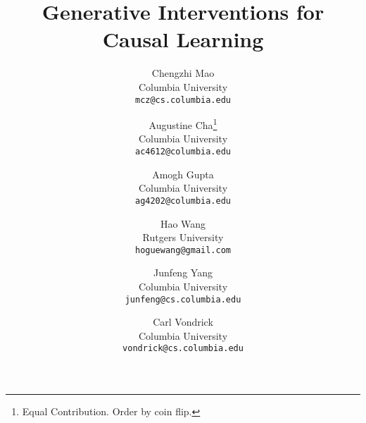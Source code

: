 \documentclass[final]{cvpr}
\begin{document}
\title{Generative Interventions for Causal Learning}

\newcommand*\samethanks[1][\value{footnote}]{\footnotemark[#1]}

\author{Chengzhi Mao \\
Columbia University\\
{\tt\small mcz@cs.columbia.edu}
\and
Augustine Cha\thanks{Equal Contribution. Order by coin flip.}\\
Columbia University\\
{\tt\small ac4612@columbia.edu}
\and
Amogh Gupta\samethanks \\
Columbia University\\
{\tt\small ag4202@columbia.edu}
\and
Hao Wang\\
Rutgers University\\
{\tt\small hoguewang@gmail.com}
\and
Junfeng Yang\\
Columbia University\\
{\tt\small junfeng@cs.columbia.edu}
\and
Carl Vondrick\\
Columbia University\\
{\tt\small vondrick@cs.columbia.edu}
}


\maketitle


\def\Blue{\color{blue}}
\def\Purple{\color{purple}}




\def\A{{\bf A}}
\def\a{{\bf a}}
\def\B{{\bf B}}
\def\b{{\bf b}}
\def\C{{\bf C}}
\def\c{{\bf c}}
\def\D{{\bf D}}
\def\d{{\bf d}}
\def\E{{\bf E}}
\def\e{{\bf e}}
\def\f{{\bf f}}
\def\F{{\bf F}}
\def\K{{\bf K}}
\def\k{{\bf k}}
\def\L{{\bf L}}
\def\H{{\bf H}}
\def\h{{\bf h}}
\def\G{{\bf G}}
\def\g{{\bf g}}
\def\I{{\bf I}}
\def\R{{\bf R}}
\def\X{{\bf X}}
\def\Y{{\bf Y}}
\def\OO{{\bf O}}
\def\oo{{\bf o}}
\def\P{{\bf P}}
\def\Q{{\bf Q}}
\def\r{{\bf r}}
\def\s{{\bf s}}
\def\S{{\bf S}}
\def\t{{\bf t}}
\def\T{{\bf T}}
\def\x{{\bf x}}
\def\y{{\bf y}}
\def\z{{\bf z}}
\def\Z{{\bf Z}}
\def\M{{\bf M}}
\def\m{{\bf m}}
\def\n{{\bf n}}
\def\U{{\bf U}}
\def\u{{\bf u}}
\def\V{{\bf V}}
\def\v{{\bf v}}
\def\W{{\bf W}}
\def\w{{\bf w}}
\def\0{{\bf 0}}
\def\1{{\bf 1}}
\def\N{{\bf N}}

\def\AM{{\mathcal A}}
\def\EM{{\mathcal E}}
\def\FM{{\mathcal F}}
\def\TM{{\mathcal T}}
\def\UM{{\mathcal U}}
\def\XM{{\mathcal X}}
\def\YM{{\mathcal Y}}
\def\NM{{\mathcal N}}
\def\OM{{\mathcal O}}
\def\IM{{\mathcal I}}
\def\GM{{\mathcal G}}
\def\PM{{\mathcal P}}
\def\LM{{\mathcal L}}
\def\MM{{\mathcal M}}
\def\DM{{\mathcal D}}
\def\SM{{\mathcal S}}
\def\RB{{\mathbb R}}
\def\EB{{\mathbb E}}
\end{document}
